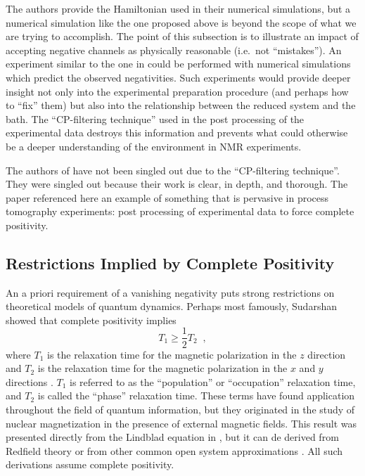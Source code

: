 The authors provide the Hamiltonian used in their numerical simulations, but a numerical simulation like the one proposed above is beyond the scope of what we are trying to accomplish.  The point of this subsection is to illustrate an impact of accepting negative channels as physically reasonable (i.e.\ not ``mistakes'').  An experiment similar to the one in \cite{Cory2004} could be performed with numerical simulations which predict the observed negativities.  Such experiments would provide deeper insight not only into the experimental preparation procedure (and perhaps how to ``fix'' them) but also into the relationship between the reduced system and the bath.  The ``CP-filtering technique'' used in the post processing of the experimental data destroys this information and prevents what could otherwise be a deeper understanding of the environment in NMR experiments.

The authors of \cite{Cory2004} have not been singled out due to the ``CP-filtering technique''.  They were singled out because their work is clear, in depth, and thorough.  The paper referenced here an example of something that is pervasive in process tomography experiments: post processing of experimental data to force complete positivity.  

\subsection{Restrictions Implied by Complete Positivity}

An a priori requirement of a vanishing negativity puts strong restrictions on theoretical models of quantum dynamics.  Perhaps most famously, Sudarshan \cite{Sudarshan1976} showed that complete positivity implies 
\begin{equation}
\label{eqn:T1}
T_1 \ge \frac{1}{2} T_2\;\;,
\end{equation}
where $T_1$ is the relaxation time for the magnetic polarization in the $z$ direction and $T_2$ is the relaxation time for the magnetic polarization in the $x$ and $y$ directions \cite{Sudarshan1978,Slichter1996,Bloch1946}.  $T_1$ is referred to as the ``population'' or ``occupation'' relaxation time, and $T_2$ is called the ``phase'' relaxation time.  These terms have found application throughout the field of quantum information, but they originated in the study of nuclear magnetization in the presence of external magnetic fields.  This result was presented directly from the Lindblad equation in \cite{Sudarshan1978}, but it can de derived from Redfield theory \cite{Slichter1996} or from other common open system approximations \cite{Skinner1987} \cite{Skinner1991}.  All such derivations assume complete positivity.  

